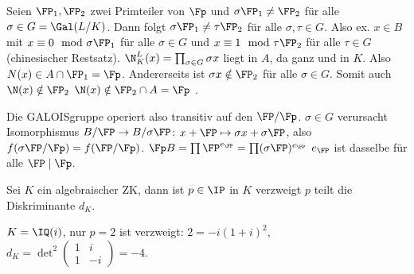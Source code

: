 \begin{Beweis}
 Seien $\FP_1,\FP_2$ zwei Primteiler von $\Fp$ und $\sigma \FP_1\neq\FP_2$ für alle $\sigma\in G=\Gal(L/K)$. Dann folgt $\sigma\FP_1\neq \tau\FP_2$ für alle $\sigma,\tau\in G$. Also ex. $x\in B$ mit $x\equiv 0 \mod{\sigma\FP_1}$ für alle $\sigma\in G$ und $x\equiv 1 \mod{\tau\FP_2}$ für alle $\tau\in G$ (chinesischer Restsatz). $\N_K^L(x)=\prod_{\sigma\in G}\sigma x$ liegt in $A$, da ganz und in $K$. Also $N(x)\in A\cap \FP_1=\Fp$. Andererseits ist $\sigma  x\notin \FP_2$ für alle $\sigma\in G$. Somit auch $\N(x)\notin\FP_2$ \folge $\N(x)\notin \FP_2\cap A=\Fp$ \lightning.
 
 Die GALOISgruppe operiert also transitiv auf den $\FP/\Fp$. $\sigma\in G$ verursacht Isomorphismus $B/\FP \rightarrow B/\sigma\FP$: $x+\FP\mapsto \sigma x+\sigma\FP$, also $f(\sigma\FP/\Fp)=f(\FP/\Fp)$. $\Fp B=\prod \FP^{e_\FP}=\prod (\sigma\FP)^{e_\FP}$ \folge $e_\FP$ ist dasselbe für alle $\FP\mid \Fp$.
\end{Beweis}

\begin{Fakt}
 Sei $K$ ein algebraischer ZK, dann ist $p\in \IP$ in $K$ verzweigt \gdw $p$ teilt die Diskriminante $d_K$.
\end{Fakt}

\begin{Beispiel}
 $K=\IQ(i)$, nur $p=2$ ist verzweigt: $2=-i(1+i)^2$, $d_K=\det^2\begin{pmatrix}
                                                                 1&i\\1&-i
                                                                \end{pmatrix}=-4$.
\end{Beispiel}

